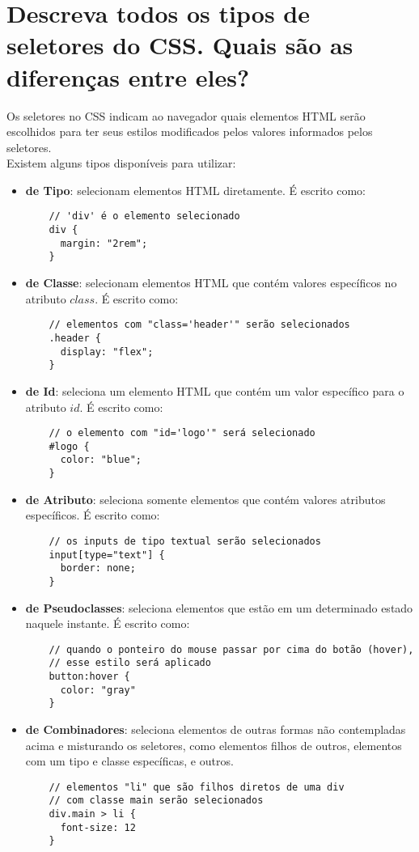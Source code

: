 \section{Descreva todos os tipos de seletores do CSS. Quais são as diferenças entre eles?}
Os seletores no CSS indicam ao navegador quais elementos HTML serão escolhidos para ter seus estilos modificados pelos valores informados pelos seletores. \\
Existem alguns tipos disponíveis para utilizar:
\begin{itemize}
  \item \textbf{de Tipo}: selecionam elementos HTML diretamente. É escrito como:
  \begin{verbatim}
    // 'div' é o elemento selecionado 
    div { 
      margin: "2rem";
    }
  \end{verbatim}
  \item \textbf{de Classe}: selecionam elementos HTML que contém valores específicos no atributo $class$. É escrito como:
  \begin{verbatim}
    // elementos com "class='header'" serão selecionados
    .header { 
      display: "flex";
    }
  \end{verbatim}
  \item \textbf{de Id}: seleciona um elemento HTML que contém um valor específico para o atributo $id$. É escrito como:
  \begin{verbatim}
    // o elemento com "id='logo'" será selecionado 
    #logo { 
      color: "blue"; 
    }
  \end{verbatim}
  \item \textbf{de Atributo}: seleciona somente elementos que contém valores atributos específicos. É escrito como:
  \begin{verbatim}
    // os inputs de tipo textual serão selecionados
    input[type="text"] { 
      border: none;
    }
  \end{verbatim}
  \item \textbf{de Pseudoclasses}: seleciona elementos que estão em um determinado estado naquele instante. É escrito como:
  \begin{verbatim}
    // quando o ponteiro do mouse passar por cima do botão (hover), 
    // esse estilo será aplicado
    button:hover { 
      color: "gray"
    }
  \end{verbatim}
  \item \textbf{de Combinadores}: seleciona elementos de outras formas não contempladas acima e misturando os seletores, como elementos filhos de outros, elementos com um tipo e classe específicas, e outros.
  \begin{verbatim}
    // elementos "li" que são filhos diretos de uma div 
    // com classe main serão selecionados
    div.main > li { 
      font-size: 12
    }
  \end{verbatim}
\end{itemize}
